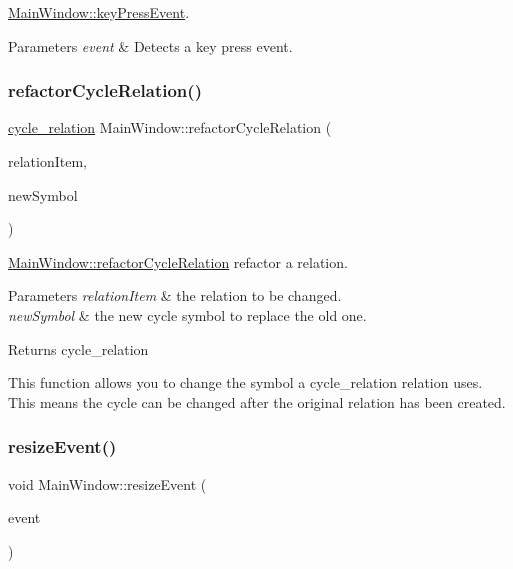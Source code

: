 \mbox{\hyperlink{class_main_window_a9c4f542263838b9ecd06eae839a42a34}{Main\+Window\+::key\+Press\+Event}}. 


\begin{DoxyParams}{Parameters}
{\em event} & Detects a key press event. \\
\hline
\end{DoxyParams}
\mbox{\label{class_main_window_a9fe708c683a2dd952ccb72e04cf4a62d}} 
\subsubsection{\texorpdfstring{refactor\+Cycle\+Relation()}{refactorCycleRelation()}}
{\footnotesize\ttfamily \mbox{\hyperlink{class_moeb_inv_1_1cycle__relation}{cycle\+\_\+relation}} Main\+Window\+::refactor\+Cycle\+Relation (\begin{DoxyParamCaption}\item[{const Gi\+Na\+C\+::ex \&}]{relation\+Item,  }\item[{const Gi\+Na\+C\+::ex \&}]{new\+Symbol }\end{DoxyParamCaption})}



\mbox{\hyperlink{class_main_window_a9fe708c683a2dd952ccb72e04cf4a62d}{Main\+Window\+::refactor\+Cycle\+Relation}} refactor a relation. 


\begin{DoxyParams}{Parameters}
{\em relation\+Item} & the relation to be changed. \\
\hline
{\em new\+Symbol} & the new cycle symbol to replace the old one. \\
\hline
\end{DoxyParams}
\begin{DoxyReturn}{Returns}
cycle\+\_\+relation
\end{DoxyReturn}
This function allows you to change the symbol a cycle\+\_\+relation relation uses. This means the cycle can be changed after the original relation has been created. \mbox{\label{class_main_window_ae12f8f63791595567b6250f8bb002bda}} 
\subsubsection{\texorpdfstring{resize\+Event()}{resizeEvent()}}
{\footnotesize\ttfamily void Main\+Window\+::resize\+Event (\begin{DoxyParamCaption}\item[{Q\+Resize\+Event $\ast$}]{event }\end{DoxyParamCaption})}



